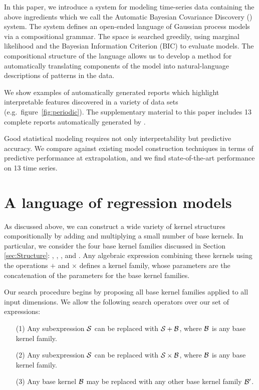 In this paper,  we introduce a system for modeling time-series data
 containing the above ingredients which we call the Automatic
Bayesian Covariance Discovery (\procedurename{}) system. The system defines an open-ended
language of Gaussian process models via a compositional grammar. The
space is searched greedily, using marginal likelihood and
the Bayesian Information Criterion (BIC) to evaluate models. The 
compositional structure of the language allows us to develop a method
for automatically translating components of the model into
natural-language descriptions of patterns in the data.

We show examples of automatically generated reports which highlight
interpretable features discovered in a variety of data sets (e.g.\
figure~\ref{fig:periodic}).  The supplementary material to this paper
includes 13 complete reports automatically generated by \procedurename{}.

Good statistical modeling requires not only
interpretability but predictive accuracy. We compare \procedurename{} against
existing model construction techniques in terms of predictive
performance at extrapolation, and we find state-of-the-art performance
on 13 time series.





\section{A language of regression models}
\label{sec:improvements}



As discussed above, we can construct a wide variety of kernel structures compositionally by adding and multiplying a small number of base kernels.
In particular, we consider the four base kernel families discussed in Section \ref{sec:Structure}: \kSE, \kPer, \kLin, and \kRQ.
Any algebraic expression combining these kernels using the operations $+$ and $\times$ defines a kernel family, whose parameters are the concatenation of the parameters for the base kernel families. 

Our search procedure begins by proposing all base kernel families applied to all input dimensions. 
We allow the following search operators over our set of expressions:
\begin{itemize}
\item[(1)] Any subexpression ${\cal S}$ can be replaced with ${\cal S} + {\cal B}$, where ${\cal B}$ is any base kernel family.
\item[(2)] Any subexpression ${\cal S}$ can be replaced with ${\cal S} \times {\cal B}$, where ${\cal B}$ is any base kernel family.
\item[(3)] Any base kernel ${\cal B}$ may be replaced with any other base kernel family ${\cal B}^\prime$.
\end{itemize}

